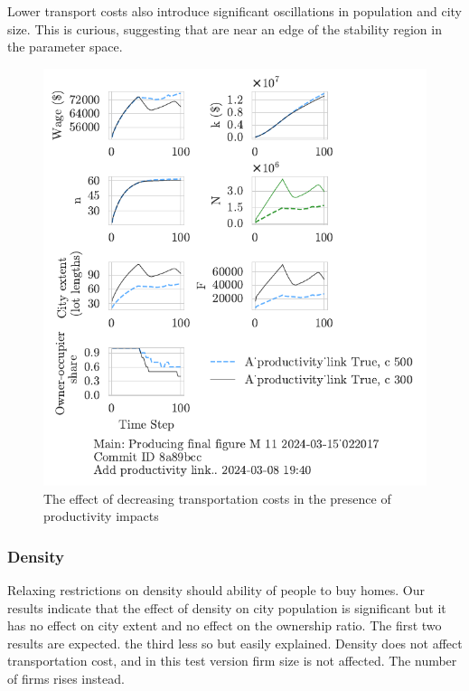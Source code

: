 {Lower transport costs also introduce significant oscillations in population and city size. This is curious, suggesting that are  near an edge of the stability region in the parameter space.



\begin{figure}[h!t]
    \centering
    \includegraphics[scale=.8, trim={0 1.4cm 0 0},clip]{fig/With-productivity_link-c-15_022017.pdf}
    \caption{The effect of decreasing transportation costs in the presence of productivity impacts}
    \label{fig:Productivity_link_and_c_ownership_trajectory}
\end{figure}


\newpage
\subsubsection{Density}
Relaxing restrictions on density should ability of people to buy homes. Our results indicate that the effect of density on city population is significant but it has no effect on city extent and no effect on the ownership ratio. The first two results are expected. the third less so but easily explained. Density does not affect transportation cost, and in this test version firm size is not affected. The number of firms rises instead. 

}
